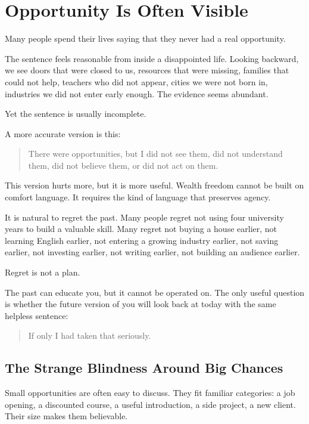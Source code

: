 \chapter{Opportunity Is Often Visible}

Many people spend their lives saying that they never had a real opportunity.

The sentence feels reasonable from inside a disappointed life. Looking backward, we see doors that were closed to us, resources that were missing, families that could not help, teachers who did not appear, cities we were not born in, industries we did not enter early enough. The evidence seems abundant.

Yet the sentence is usually incomplete.

A more accurate version is this:

\begin{quote}
There were opportunities, but I did not see them, did not understand them, did not believe them, or did not act on them.
\end{quote}

This version hurts more, but it is more useful. Wealth freedom cannot be built on comfort language. It requires the kind of language that preserves agency.

It is natural to regret the past. Many people regret not using four university years to build a valuable skill. Many regret not buying a house earlier, not learning English earlier, not entering a growing industry earlier, not saving earlier, not investing earlier, not writing earlier, not building an audience earlier.

Regret is not a plan.

The past can educate you, but it cannot be operated on. The only useful question is whether the future version of you will look back at today with the same helpless sentence:

\begin{quote}
If only I had taken that seriously.
\end{quote}

\section*{The Strange Blindness Around Big Chances}

Small opportunities are often easy to discuss. They fit familiar categories: a job opening, a discounted course, a useful introduction, a side project, a new client. Their size makes them believable.


